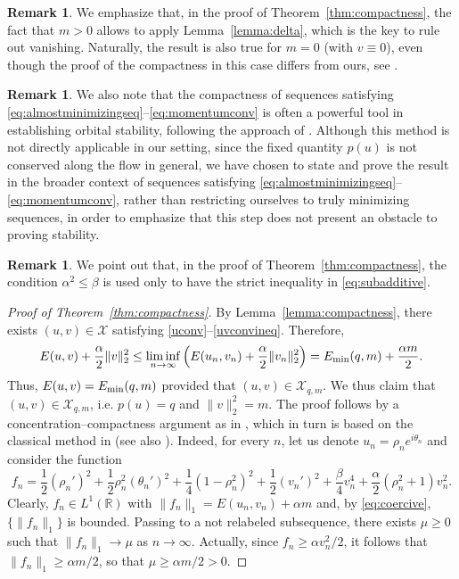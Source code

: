 \documentclass[11pt]{article}
\newcommand{\R}{\mathbb{R}}
\newcommand{\boX}{\mathcal{X}}
\newcommand{\Emin}{E_\textup{min}}
\theoremstyle{plain}
\theoremstyle{definition}
\newtheorem{remark}[theorem]{Remark}
\theoremstyle{remark}
\numberwithin{equation}{section}
\begin{document}
{\begin{remark}\label{remark:vanishing}
    We emphasize that, in the proof of Theorem~\ref{thm:compactness}, the fact that $m>0$ allows to apply Lemma~\ref{lemma:delta}, which is the key to rule out vanishing. Naturally, the result is also true for $m=0$ (with $v\equiv 0$), even though the {proof of the compactness} in this case differs from ours, see \cite{bethuel0}.
\end{remark}

\begin{remark}\label{remark:stability}
    We also note that the compactness of {sequences satisfying \eqref{eq:almostminimizingseq}--\eqref{eq:momentumconv}} is often a powerful tool in establishing orbital stability, following the approach of \cite{cazlions}. Although this method is not directly applicable in our setting, since the fixed quantity $p(u)$ is not conserved along the flow in general, we have chosen to state and prove the result in the broader context of {sequences satisfying \eqref{eq:almostminimizingseq}--\eqref{eq:momentumconv}}, rather than restricting ourselves to truly minimizing sequences, in order to emphasize that this step does not present an obstacle to proving stability. 
\end{remark}

{
\begin{remark}
    We point out that, in the proof of Theorem~\ref{thm:compactness}, the condition $\alpha^2\leq \beta$ is used only to have the strict inequality in \eqref{eq:subadditive}.
\end{remark}
}

\begin{proof}[Proof of Theorem~\ref{thm:compactness}]
By Lemma~\ref{lemma:compactness}, there exists $(u,v)\in\boX$ satisfying \eqref{uconv}--\eqref{uvconvineq}. Therefore,
    \begin{equation}\label{proof:fatou}
        E(u,v)+\frac{\alpha}{2}\|v\|_2^2\leq \liminf_{n\to\infty} \Big(E(u_n,v_n)+\frac{\alpha}{2}\|v_n\|_2^2\Big)=\Emin(q,m)+\frac{\alpha m}{2}.
    \end{equation}
Thus, $E(u,v)= \Emin(q,m)$ provided that $(u,v)\in\boX_{q,m}$. We thus claim that $(u,v)\in\boX_{q,m}$, i.e. $p(u)=q$ and $\|v\|_2^2=m$. The proof follows by a concentration--compactness argument as in \cite{alhelou}{, which in turn is based on the classical method in \cite{CCPLionsI} (see also \cite{cazenave})}. Indeed, for every $n$, let us denote $u_n=\rho_n e^{i\theta_n}$ and consider the function
    \[f_n=\frac12(\rho_n')^2+\frac12\rho_n^2(\theta_n')^2+\frac14(1-\rho_n^2)^2+\frac12(v_n')^2+\frac{\beta}{4}v_n^4+\frac{\alpha}{2}(\rho_n^2+1) v_n^2.\]
    Clearly, $f_n\in L^1(\R)$ with $\|f_n\|_1=E(u_n,v_n)+\alpha m$ and, by \eqref{eq:coercive}, 
    $\{\|f_n\|_1\}$ is bounded. Passing to a not relabeled subsequence, there exists $\mu\geq 0$ such that $\|f_n\|_1\to\mu$ as $n\to\infty$. Actually, since $f_n\geq \alpha v_n^2/2$, it follows that $\|f_n\|_1\geq \alpha m/2$, so that $\mu\geq \alpha m/2>0$.
    

\end{proof}}
\end{document}
